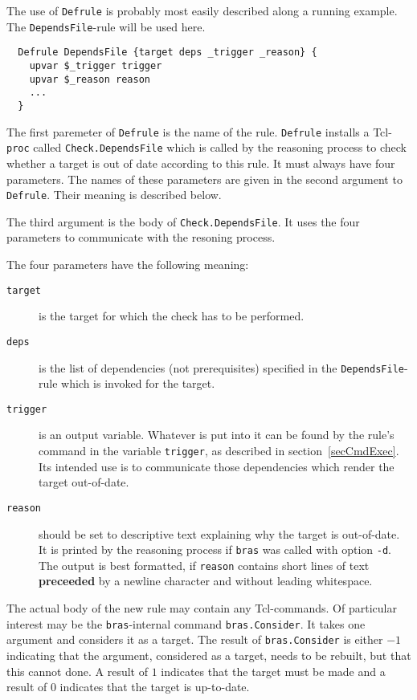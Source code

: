 \documentclass[12pt]{article}
\newcommand{\bras}{\texttt{bras}}
\begin{document}
The use of \texttt{Defrule} is probably most easily described along a
running example. The \texttt{DependsFile}-rule will be used here.
\begin{verbatim}
  Defrule DependsFile {target deps _trigger _reason} {
    upvar $_trigger trigger
    upvar $_reason reason
    ...
  }
\end{verbatim}

The first paremeter of \texttt{Defrule} is the name of the
rule. \texttt{Defrule} installs a Tcl-\texttt{proc} called
\texttt{Check.DependsFile} which is called by the reasoning process to
check whether a target is out of date according to this rule. It must
always have four parameters. The names of these parameters are given in
the second argument to \texttt{Defrule}. Their meaning is described below.

The third argument is the body of \texttt{Check.DependsFile}. It uses
the four parameters to communicate with the resoning process.

The four parameters have the following meaning:

\begin{description}
\item[\texttt{target}]
is the target for which the check has to be
performed. 

\item[\texttt{deps}]
is the list of dependencies (not prerequisites) specified in the
\texttt{DependsFile}-rule which is invoked for the target.

\item[\texttt{trigger}]
is an output variable. Whatever is put into it can be found by the
rule's command in the variable \texttt{trigger}, as described in
section~\ref{secCmdExec}. Its intended use is to communicate those
dependencies which render the target
out-of-date.

\item[\texttt{reason}] should be set to descriptive text explaining
why the target is out-of-date. It is printed by the reasoning process
if \bras{} was called with option \texttt{-d}. The output is best
formatted, if \texttt{reason} contains short lines of text
\textbf{preceeded} by a newline character and without leading
whitespace.
\end{description}

The actual body of the new rule may contain any Tcl-commands. Of
particular interest may be the \bras{}-internal command
\texttt{bras.Consider}. It takes one argument and considers it as a
target. The result of \texttt{bras.Consider} is either $-1$ indicating
that the argument, considered as a target, needs to be rebuilt, but
that this cannot done. A result of $1$ indicates that the target must
be made and a result of $0$ indicates that the target is up-to-date.
\end{document}
